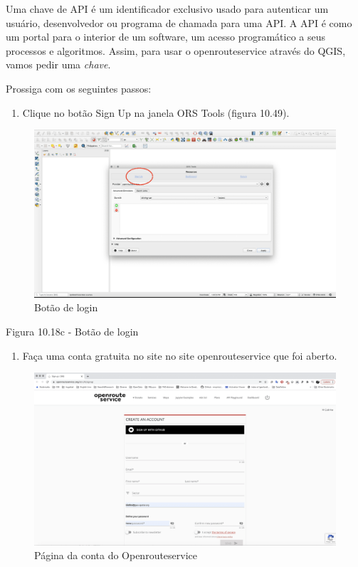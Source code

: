 \documentclass[
]{krantz}
\providecommand{\tightlist}{%
  \setlength{\itemsep}{0pt}\setlength{\parskip}{0pt}}
\begin{document}
Uma chave de API é um identificador exclusivo usado para autenticar um usuário, desenvolvedor ou programa de chamada para uma API. A API é como um portal para o interior de um software, um acesso programático a seus processos e algoritmos. Assim, para usar o openrouteservice através do QGIS, vamos pedir uma \emph{chave}.

Prossiga com os seguintes passos:

\begin{enumerate}
\def\labelenumi{\arabic{enumi}.}
\tightlist
\item
  Clique no botão Sign Up na janela ORS Tools (figura 10.49).
\end{enumerate}

\begin{figure}
\centering
\includegraphics{media/modulo10/fig1018_c.png}
\caption{Botão de login}
\end{figure}

Figura 10.18c - Botão de login

\begin{enumerate}
\def\labelenumi{\arabic{enumi}.}
\setcounter{enumi}{1}
\tightlist
\item
  Faça uma conta gratuita no site no site openrouteservice que foi aberto.
\end{enumerate}

\begin{figure}
\centering
\includegraphics{media/modulo10/fig1018_d.png}
\caption{Página da conta do Openrouteservice}
\end{figure}
\end{document}
